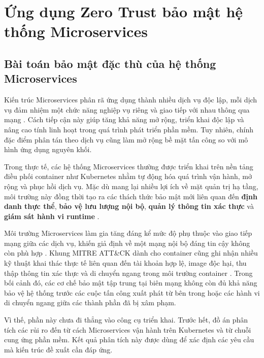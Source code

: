 \chapter[ỨNG DỤNG ZERO TRUST BẢO MẬT HỆ THỐNG MICROSERVICES]{Ứng dụng Zero Trust bảo mật hệ thống Microservices}
\label{chap:chapter2}

\section{Bài toán bảo mật đặc thù của hệ thống Microservices}

Kiến trúc Microservices phân rã ứng dụng thành nhiều dịch vụ độc lập, mỗi dịch vụ đảm nhiệm một chức năng nghiệp vụ riêng và giao tiếp với nhau thông qua mạng \parencite{lewis_fowler_2014}. Cách tiếp cận này giúp tăng khả năng mở rộng, triển khai độc lập và nâng cao tính linh hoạt trong quá trình phát triển phần mềm. Tuy nhiên, chính đặc điểm phân tán theo dịch vụ cũng làm mở rộng bề mặt tấn công so với mô hình ứng dụng nguyên khối.

Trong thực tế, các hệ thống Microservices thường được triển khai trên nền tảng điều phối container như Kubernetes nhằm tự động hóa quá trình vận hành, mở rộng và phục hồi dịch vụ. Mặc dù mang lại nhiều lợi ích về mặt quản trị hạ tầng, môi trường này đồng thời tạo ra các thách thức bảo mật mới liên quan đến \textbf{định danh thực thể}, \textbf{bảo vệ lưu lượng nội bộ}, \textbf{quản lý thông tin xác thực} và \textbf{giám sát hành vi runtime} \parencite{nist800204_microservices,nist800204c_devsecops_microservices,kubernetes_docs}.

Môi trường Microservices làm gia tăng đáng kể mức độ phụ thuộc vào giao tiếp mạng giữa các dịch vụ, khiến giả định về một mạng nội bộ đáng tin cậy không còn phù hợp \parencite{nist800204_microservices}. Khung MITRE ATT\&CK dành cho container cũng ghi nhận nhiều kỹ thuật khai thác thực tế liên quan đến tài khoản hợp lệ, image độc hại, thu thập thông tin xác thực và di chuyển ngang trong môi trường container \parencite{mitre_containers}. Trong bối cảnh đó, các cơ chế bảo mật tập trung tại biên mạng không còn đủ khả năng bảo vệ hệ thống trước các cuộc tấn công xuất phát từ bên trong hoặc các hành vi di chuyển ngang giữa các thành phần đã bị xâm phạm.

Vì thế, phần này chưa đi thẳng vào công cụ triển khai. Trước hết, đồ án phân tích các rủi ro đến từ cách Microservices vận hành trên Kubernetes và từ chuỗi cung ứng phần mềm. Kết quả phân tích này được dùng để xác định các yêu cầu mà kiến trúc đề xuất cần đáp ứng.


